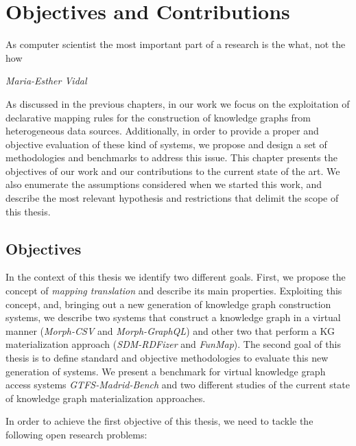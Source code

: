 \chapter{Objectives and Contributions}

\epigraph{As computer scientist the most important part of a research is the what, not the how}{\textit{Maria-Esther Vidal}}

\label{chap:objectives}
As discussed in the previous chapters, in our work we focus on the exploitation of declarative mapping rules for the construction of knowledge graphs from heterogeneous data sources. Additionally, in order to provide a proper and objective evaluation of these kind of systems, we propose and design a set of methodologies and benchmarks to address this issue. This chapter presents the objectives of our work and our contributions to the current state of the art. We also enumerate the assumptions considered when we started this work, and describe the most relevant hypothesis and restrictions that delimit the scope of this thesis.

\section{Objectives}
In the context of this thesis we identify two different goals. First, we propose the concept of \textit{mapping translation} and describe its main properties. Exploiting this concept, and, bringing out a new generation of knowledge graph construction systems, we describe two systems that construct a knowledge graph in a virtual manner (\textit{Morph-CSV} and \textit{Morph-GraphQL}) and other two that perform a KG materialization approach (\textit{SDM-RDFizer} and \textit{FunMap}). The second goal of this thesis is to define standard and objective methodologies to evaluate this new generation of systems. We present a benchmark for virtual knowledge graph access systems \textit{GTFS-Madrid-Bench} and two different studies of the current state of knowledge graph materialization approaches.

In order to achieve the first objective of this thesis, we need to tackle the following open research problems:

